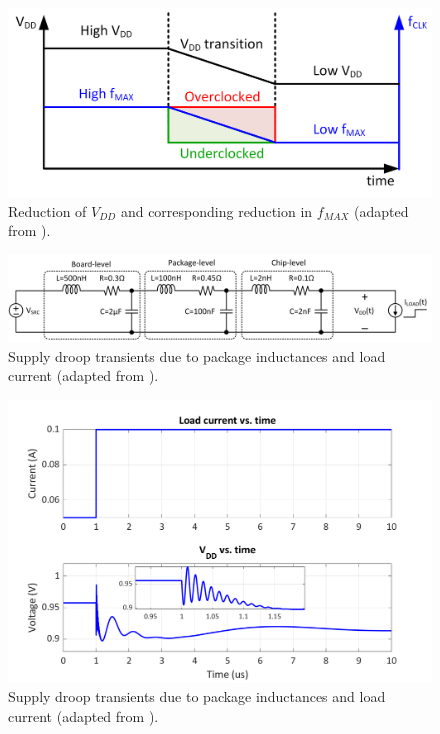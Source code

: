 \documentclass[twoside,9pt,journal,letterpage]{IEEEtran}
\begin{document}
\begin{figure}[h]
	\centering
	\includegraphics[width=\columnwidth]{fig_fmax}
	\caption{Reduction of $V_{DD}$ and corresponding reduction in $f_{MAX}$ (adapted from \cite{ahmad2017}).}
	\label{fig:fmax}
\end{figure}
\begin{figure}[h]
	\centering
	\includegraphics[width=\columnwidth]{fig_droop_schem}
	\caption{Supply droop transients due to package inductances and load current (adapted from \cite{hashimoto2018}).}
	\label{fig:droop1}
\end{figure}
\begin{figure}[h]
	\centering
	\includegraphics[width=\columnwidth]{fig_droop}
	\caption{Supply droop transients due to package inductances and load current (adapted from \cite{hashimoto2018}).}
	\label{fig:droop2}
\end{figure}
\end{document}

